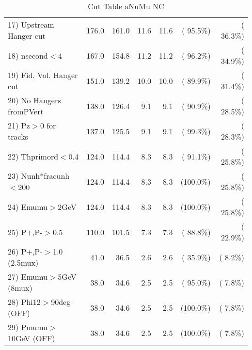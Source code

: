 \begin{table}[h!]
\begin{tabular}{||l||r|r|r|r|r|r||}
 17) Upstream Hanger cut  &        176.0 &        161.0 &         11.6 &         11.6 & ( 95.5\%) & ( 36.3\%) \\
 18) nsecond$<$4          &        167.0 &        154.8 &         11.2 &         11.2 & ( 96.2\%) & ( 34.9\%) \\
 19) Fid. Vol. Hanger cut &        151.0 &        139.2 &         10.0 &         10.0 & ( 89.9\%) & ( 31.4\%) \\
 20) No Hangers fromPVert &        138.0 &        126.4 &          9.1 &          9.1 & ( 90.9\%) & ( 28.5\%) \\
 21) Pz$>$0 for tracks    &        137.0 &        125.5 &          9.1 &          9.1 & ( 99.3\%) & ( 28.3\%) \\
 22) Thprimord$<$0.4      &        124.0 &        114.4 &          8.3 &          8.3 & ( 91.1\%) & ( 25.8\%) \\
 23) Nunh*fracunh$<$200   &        124.0 &        114.4 &          8.3 &          8.3 & (100.0\%) & ( 25.8\%) \\
 24) Emumu$>$2GeV         &        124.0 &        114.4 &          8.3 &          8.3 & (100.0\%) & ( 25.8\%) \\
 25) P+,P-$>$0.5          &        110.0 &        101.5 &          7.3 &          7.3 & ( 88.8\%) & ( 22.9\%) \\
 26) P+,P-$>$1.0 (2.5mux) &         41.0 &         36.5 &          2.6 &          2.6 & ( 35.9\%) & (  8.2\%) \\
 27) Emumu$>$5GeV  (8mux) &         38.0 &         34.6 &          2.5 &          2.5 & ( 95.0\%) & (  7.8\%) \\
 28) Phi12$>$90deg  (OFF) &         38.0 &         34.6 &          2.5 &          2.5 & (100.0\%) & (  7.8\%) \\
 29) Pmumu$>$10GeV  (OFF) &         38.0 &         34.6 &          2.5 &          2.5 & (100.0\%) & (  7.8\%) \\
 \hline
 \hline
 \end{tabular}
 \caption{Cut Table  aNuMu NC }
 \label{tab-cutcohjpsi-mumu_anumunc}
 \end{table}
